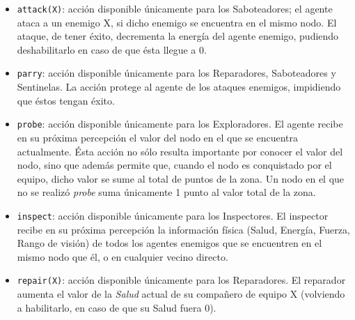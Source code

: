 \begin{itemize}
	\item \texttt{attack(X)}: acción disponible únicamente para los Saboteadores; el agente ataca a un enemigo X, si dicho enemigo se encuentra en el mismo nodo. El ataque, de tener éxito, decrementa la energía del agente enemigo, pudiendo deshabilitarlo en caso de que ésta llegue a 0.
	\item \texttt{parry}: acción disponible únicamente para los Reparadores, Saboteadores y Sentinelas. La acción protege al agente de los ataques enemigos, impidiendo que éstos tengan éxito.
	\item \texttt{probe}: acción disponible únicamente para los Exploradores. El agente recibe en su próxima percepción el valor del nodo en el que se encuentra actualmente. Ésta acción no sólo resulta importante por conocer el valor del nodo, sino que además permite que, cuando el nodo es conquistado por el equipo, dicho valor se sume al total de puntos de la zona. Un nodo en el que no se realizó \textit{probe} suma únicamente 1 punto al valor total de la zona.
	\item \texttt{inspect}: acción disponible únicamente para los Inspectores. El inspector recibe en su próxima percepción la información física (Salud, Energía, Fuerza, Rango de visión) de todos los agentes enemigos que se encuentren en el mismo nodo que él, o en cualquier vecino directo.
	\item \texttt{repair(X)}: acción disponible únicamente para los Reparadores. El reparador aumenta el valor de la \emph{Salud} actual de su compañero de equipo X (volviendo a habilitarlo, en caso de que su Salud fuera 0).
\end{itemize}

